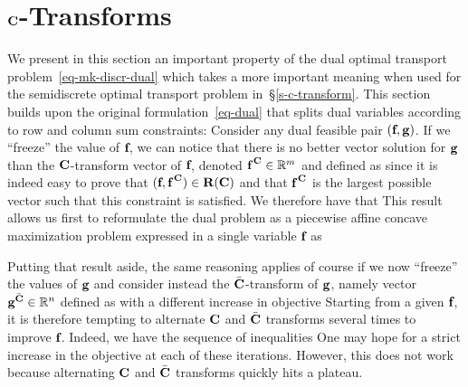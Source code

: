 \section{$\mathrm{\textbf{C}}$-Transforms}\label{sec-c-transforms} We present in this section an important property of the dual optimal transport problem~\eqref{eq-mk-discr-dual} which takes a more important meaning when used for the semidiscrete optimal transport problem in~\S\ref{s-c-transform}. This section builds upon the original formulation~\eqref{eq-dual} that splits dual variables according to row and column sum constraints:
Consider any dual feasible pair $(\mathrm{\textbf{f}},\mathrm{\textbf{g}})$. If we ``freeze'' the value of $\mathrm{\textbf{f}}$, we can notice that there is no better vector solution for $\mathrm{\textbf{g}}$ than the $\mathrm{\textbf{C}}$-transform vector of $\mathrm{\textbf{f}}$, denoted $\mathrm{\textbf{f}}^{\,\mathrm{\textbf{C}}}\in\mathbb{R}^m$ and defined as
since it is indeed easy to prove that $(\mathrm{\textbf{f}},\mathrm{\textbf{f}}^{\,\mathrm{\textbf{C}}})\in\mathrm{\textbf{R}}(\mathrm{\textbf{C}})$ and that $\mathrm{\textbf{f}}^{\,\mathrm{\textbf{C}}}$ is the largest possible vector such that this constraint is satisfied. We therefore have that
This result allows us first to reformulate the dual problem as a piecewise affine concave maximization problem expressed in a single variable $\mathrm{\textbf{f}}$ as

Putting that result aside, the same reasoning applies of course if we now ``freeze'' the values of $\mathrm{\textbf{g}}$ and consider instead the $\bar{\mathrm{\textbf{C}}}$-transform of $\mathrm{\textbf{g}}$, namely vector $\mathrm{\textbf{g}}^{\bar{\mathrm{\textbf{C}}}}\in\mathbb{R}^n$ defined as
with a different increase in objective
Starting from a given $\mathrm{\textbf{f}}$, it is therefore tempting to alternate $\mathrm{\textbf{C}}$ and $\bar{\mathrm{\textbf{C}}}$ transforms several times to improve $\mathrm{\textbf{f}}$. Indeed, we have the sequence of inequalities
\eq{
	\dotp{\fD}{\a} + \dotp{\fD^{\,\C}}{\b} \leq \dotp{\fD^{\,\C\bar{\C}}}{\a} + \dotp{\fD^{\,\C}}{\b}\leq  \dotp{\fD^{\,\C\bar{\C}}}{\a} + \dotp{\fD^{\,\C\bar{\C}\C}}{\b}\leq  \dots
} 
One may hope for a strict increase in the objective at each of these iterations. However, this does not work because alternating $\mathrm{\textbf{C}}$ and $\bar{\mathrm{\textbf{C}}}$ transforms quickly hits a plateau.


